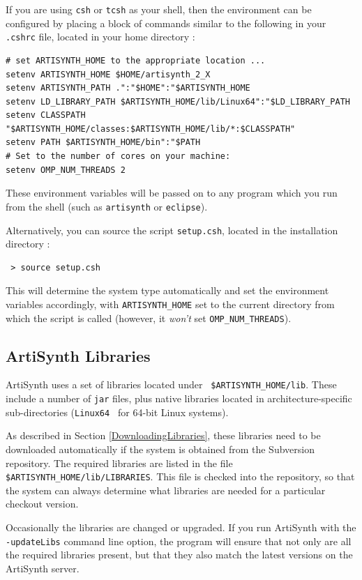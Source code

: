 \documentclass{article}
\def\SEP{/}
\def\FULLSYSTEM{64-bit Linux }
\def\ARCH{Linux64 }
\def\directory{directory }
\def\directories{directories }
\begin{document}
If you are using {\tt csh} or {\tt tcsh} as your shell, then the
environment can be configured by placing a block of commands similar
to the following in your {\tt .cshrc} file, located in your home
\directory:

\begin{lstlisting}
# set ARTISYNTH_HOME to the appropriate location ...
setenv ARTISYNTH_HOME $HOME/artisynth_2_X
setenv ARTISYNTH_PATH .":"$HOME":"$ARTISYNTH_HOME
setenv LD_LIBRARY_PATH $ARTISYNTH_HOME/lib/Linux64":"$LD_LIBRARY_PATH
setenv CLASSPATH "$ARTISYNTH_HOME/classes:$ARTISYNTH_HOME/lib/*:$CLASSPATH"
setenv PATH $ARTISYNTH_HOME/bin":"$PATH
# Set to the number of cores on your machine:
setenv OMP_NUM_THREADS 2 
\end{lstlisting}

These environment variables will be passed on to any program which you
run from the shell (such as {\tt artisynth} or {\tt eclipse}). 

Alternatively, you can source the script {\tt setup.csh}, located in
the installation \directory:

\begin{verbatim}
 > source setup.csh
\end{verbatim}

This will determine the system type automatically and set the
environment variables accordingly, with {\tt ARTISYNTH\_HOME} set to the
current \directory from which the script is called (however,
it {\it won't} set {\tt OMP\_NUM\_THREADS}).

\subsection{ArtiSynth Libraries}

ArtiSynth uses a set of libraries located under {\tt
\$ARTISYNTH\_HOME\SEP lib}. These include a number of {\tt jar} files,
plus native libraries located in architecture-specific sub-\directories
({\tt \ARCH} for \FULLSYSTEM systems).

As described in Section \ref{DownloadingLibraries}, these libraries
need to be downloaded automatically if the system is obtained from the
Subversion repository. The required libraries are listed in the file
{\tt \$ARTISYNTH\_HOME\SEP lib\SEP LIBRARIES}. This file is checked
into the repository, so that the system can always determine what
libraries are needed for a particular checkout version.

Occasionally the libraries are changed or upgraded.  If you run
ArtiSynth with the {\tt -updateLibs} command line option, the program
will ensure that not only are all the required libraries present, but
that they also match the latest versions on the ArtiSynth server.
\end{document}
